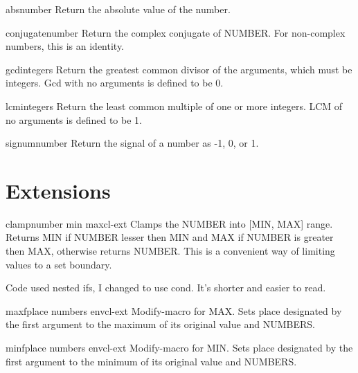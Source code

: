 \begin{function}{abs}{number}{}{}
  Return the absolute value of the number.
\end{function}

\begin{function}{conjugate}{number}{}{}
  Return the complex conjugate of NUMBER. For non-complex numbers, this is
  an identity.
\end{function}

\begin{function}{gcd}{\rest integers}{}{}
  Return the greatest common divisor of the arguments, which must be
  integers. Gcd with no arguments is defined to be 0.
\end{function}

\begin{function}{lcm}{\rest integers}{}{}
  Return the least common multiple of one or more integers. LCM of no
  arguments is defined to be 1.
\end{function}

\begin{function}{signum}{number}{}{}
  Return the signal of a number as -1, 0, or 1.
\end{function}

\section{Extensions}
\label{sec:extensions-1}

\begin{function}{clamp}{number min max}{cl-ext}{}
  Clamps the NUMBER into [MIN, MAX] range. Returns MIN if NUMBER
  lesser then MIN and MAX if NUMBER is greater then MAX, otherwise
  returns NUMBER. This is a convenient way of limiting values to a set
  boundary.
  \begin{devnote}
    Code used nested ifs, I changed to use cond. It's shorter and
    easier to read.
  \end{devnote}
\end{function}

\begin{macro}{maxf}{place \rest numbers \env env}{cl-ext}{}
  Modify-macro for MAX. Sets place designated by the first argument to the
maximum of its original value and NUMBERS.
\end{macro}

\begin{macro}{minf}{place \rest numbers \env env}{cl-ext}{}
  Modify-macro for MIN. Sets place designated by the first argument to the
minimum of its original value and NUMBERS.
\end{macro}

